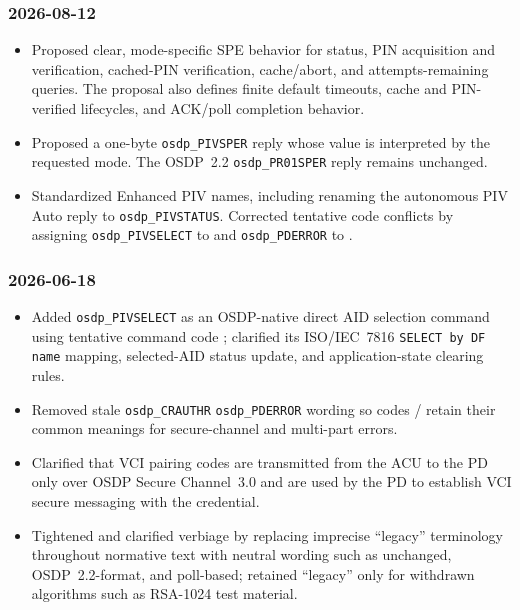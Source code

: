 \subsubsection*{2026-08-12}
\begin{itemize}
  \item Proposed clear, mode-specific SPE behavior for status, PIN acquisition and verification,
    cached-PIN verification, cache/abort, and attempts-remaining queries. The proposal also defines
    finite default timeouts, cache and PIN-verified lifecycles, and ACK/poll completion behavior.
  \item Proposed a one-byte \texttt{osdp\_PIVSPER} reply whose value is interpreted by the requested
    mode. The OSDP~2.2 \texttt{osdp\_PR01SPER} reply remains unchanged.
  \item Standardized Enhanced PIV names, including renaming the autonomous PIV Auto reply to
    \texttt{osdp\_PIVSTATUS}. Corrected tentative code conflicts by assigning
    \texttt{osdp\_PIVSELECT} to  and \texttt{osdp\_PDERROR} to .
\end{itemize}

\subsubsection*{2026-06-18}
\begin{itemize}
  \item Added \texttt{osdp\_PIVSELECT} as an OSDP-native direct AID selection command using
    tentative command code ; clarified its ISO/IEC~7816 \texttt{SELECT by DF name}
    mapping, selected-AID status update, and application-state clearing rules.
  \item Removed stale \texttt{osdp\_CRAUTHR} \texttt{osdp\_PDERROR} wording so codes
    / retain their common meanings for secure-channel and multi-part
    errors.
  \item Clarified that VCI pairing codes are transmitted from the ACU to the PD only over OSDP
    Secure Channel~3.0 and are used by the PD to establish VCI secure messaging with the credential.
  \item Tightened and clarified verbiage by replacing imprecise ``legacy'' terminology throughout
    normative text with neutral wording such as unchanged, OSDP~2.2-format, and poll-based; retained
    ``legacy'' only for withdrawn algorithms such as RSA-1024 test material.
\end{itemize}

